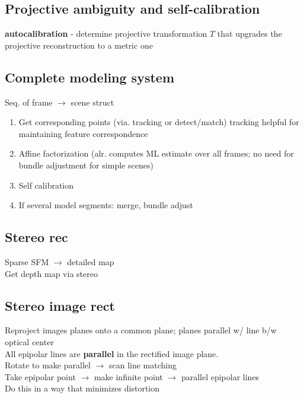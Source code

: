 \documentclass{article}
\begin{document}
\subsection{Projective ambiguity and self-calibration}
\textbf{autocalibration} - determine projective transformation $T$ that
upgrades the projective reconstruction to a metric one


\subsection{Complete modeling system}
Seq. of frame $\to$ scene struct
\begin{enumerate}
  \item Get corresponding points (via. tracking or detect/match)
    \subitem tracking helpful for maintaining feature correspondence
  
  \item Affine factorization (alr. computes ML estimate over all frames; no need for
  bundle adjustment for simple scenes)

  \item Self calibration
  
  \item If several model segments: merge, bundle adjust

\end{enumerate}

\subsection{Stereo rec}
Sparse SFM $\to$ detailed map
\\
Get depth map via stereo


\subsection{Stereo image rect}
Reproject images planes onto a common plane; planes parallel w/ line b/w optical center 
\\
All epipolar lines are \textbf{parallel} in the rectified image plane.
\\
Rotate to make parallel $\to$ scan line matching
\\[5pt]
Take epipolar point $\to$ make infinite point $\to$ parallel epipolar lines
\\
Do this in a way that minimizes distortion
\end{document}
